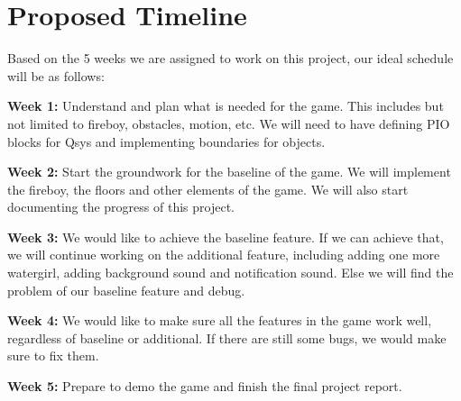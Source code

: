 \documentclass[a4paper]{article}
\begin{document}
\section{Proposed Timeline}
Based on the 5 weeks we are assigned to work on this project, our ideal schedule will be as follows:
\par \textbf{Week 1:} Understand and plan what is needed for the game. This includes but not limited to fireboy, obstacles, motion, etc. We will need to have defining PIO blocks for Qsys and implementing boundaries for objects.

\par \textbf{Week 2:} ​Start the groundwork for the baseline of the game. We will implement the fireboy, the floors and other elements of the game. We will also start documenting the progress of this project.

\par \textbf{Week 3:} We would like to achieve the baseline feature. If we can achieve that, we will continue working on the additional feature, including adding one more watergirl, adding background sound and notification sound. Else we will find the problem of our baseline feature and debug.

\par \textbf{Week 4:} ​We would like to make sure all the features in the game work well, regardless of baseline or additional. If there are still some bugs, we would make sure to fix them.

\par \textbf{Week 5:} Prepare to demo the game and finish the final project report.
\end{document}
